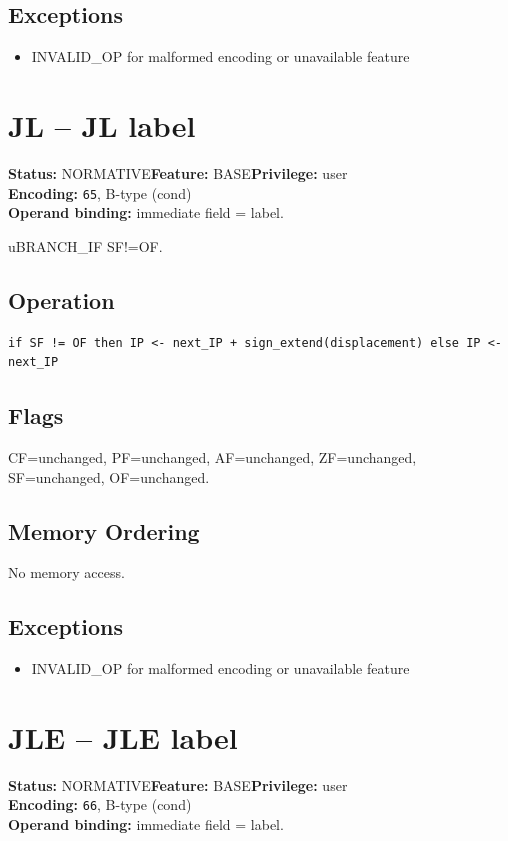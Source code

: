 \documentclass[10pt]{article}
\begin{document}
\subsection*{Exceptions}
\begin{itemize}
\item INVALID\_OP for malformed encoding or unavailable feature
\end{itemize}
\clearpage

\section{JL -- JL label}
\textbf{Status:} NORMATIVE\quad \textbf{Feature:} BASE\quad \textbf{Privilege:} user\\
\textbf{Encoding:} \texttt{65}, B-type (cond)\\
\textbf{Operand binding:} immediate field = label.

uBRANCH\_IF SF!=OF.

\subsection*{Operation}
\begin{lstlisting}
if SF != OF then IP <- next_IP + sign_extend(displacement) else IP <- next_IP
\end{lstlisting}
\subsection*{Flags}
CF=unchanged, PF=unchanged, AF=unchanged, ZF=unchanged, SF=unchanged, OF=unchanged.
\subsection*{Memory Ordering}
No memory access.
\subsection*{Exceptions}
\begin{itemize}
\item INVALID\_OP for malformed encoding or unavailable feature
\end{itemize}
\clearpage

\section{JLE -- JLE label}
\textbf{Status:} NORMATIVE\quad \textbf{Feature:} BASE\quad \textbf{Privilege:} user\\
\textbf{Encoding:} \texttt{66}, B-type (cond)\\
\textbf{Operand binding:} immediate field = label.
\end{document}
